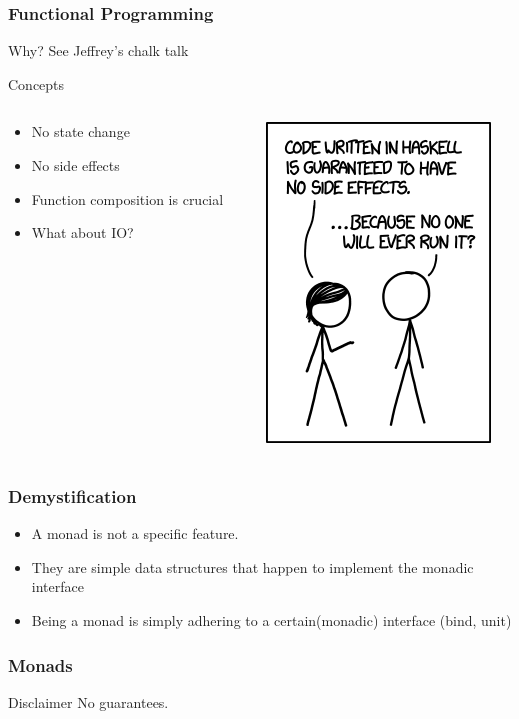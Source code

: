 \begin{frame}
    \frametitle{Functional Programming}
    \begin{block}{Why?}
        See Jeffrey's chalk talk
    \end{block}
    \begin{block}{Concepts}
        \begin{columns}
            \begin{column}{0.5\textwidth}
                \begin{itemize}
                    \item No state change
                    \item No side effects
                    \item Function composition is crucial
                    \item What about IO?
                \end{itemize}
            \end{column}
            \begin{column}{0.5\textwidth}
                \includegraphics[scale=0.5]{images/xkcd}
            \end{column}
        \end{columns}
    \end{block}
\end{frame}
\begin{frame}
    \frametitle{Demystification}
    \begin{block}{}
        \begin{itemize}
            \item A monad is not a specific feature.
            \item They are simple data structures that happen to implement the monadic interface
            \item Being a monad is simply adhering to a certain(monadic) interface (bind, unit)
        \end{itemize}
    \end{block}
\end{frame}
\begin{frame}
    \frametitle{Monads}
    \begin{block}{Disclaimer}
        No guarantees.
    \end{block}
\end{frame}
